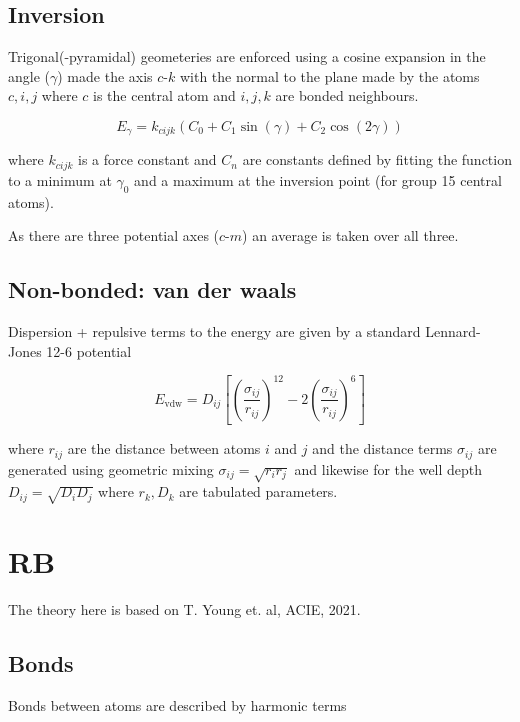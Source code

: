 \documentclass[10pt]{article}
\begin{document}
\subsection{Inversion}

Trigonal(-pyramidal) geometeries are enforced using a cosine expansion in the
angle ($\gamma$) made the axis $c\text{-}k$ with the normal to the plane made by the
atoms $c, i, j$ where $c$ is the central atom and $i,j,k$ are bonded neighbours.

\begin{equation}
    E_\gamma = k_{cijk} (C_0 + C_1 \sin(\gamma) + C_2 \cos(2\gamma))
\end{equation}

where $k_{cijk}$ is a force constant and $C_n$ are constants defined by fitting
the function to a minimum at $\gamma_0$ and a maximum at the inversion point (for
group 15 central atoms).

As there are three potential axes ($c\text{-}m$) an average is taken over all three.


\subsection{Non-bonded: van der waals}

Dispersion + repulsive terms to the energy are given by a standard Lennard-Jones
12-6 potential

\begin{equation}
    E_\text{vdw} = D_{ij} \left[\left( \frac{\sigma_{ij}}{r_{ij}} \right)^{12}
                                -2 \left( \frac{\sigma_{ij}}{r_{ij}} \right)^6
                            \right]
\end{equation}

where $r_{ij}$ are the distance between atoms $i$ and $j$ and the distance
terms $\sigma_{ij}$ are generated using geometric mixing
$\sigma_{ij} = \sqrt{r_i r_j}$ and likewise for the well depth
$D_{ij} = \sqrt{D_i D_j}$ where $r_k, D_k$ are tabulated parameters.


\section{RB}
The theory here is based on T. Young et. al, ACIE, 2021.

\subsection{Bonds}
Bonds between atoms are described by harmonic terms
\end{document}
